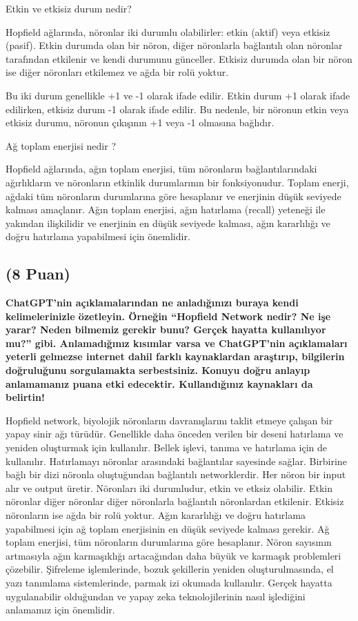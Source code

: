 \documentclass[11pt]{article}
\begin{document}
Etkin ve etkisiz durum nedir?

Hopfield ağlarında, nöronlar iki durumlu olabilirler: etkin (aktif) veya etkisiz (pasif). Etkin durumda olan bir nöron, diğer nöronlarla bağlantılı olan nöronlar tarafından etkilenir ve kendi durumunu günceller. Etkisiz durumda olan bir nöron ise diğer nöronları etkilemez ve ağda bir rolü yoktur.

Bu iki durum genellikle +1 ve -1 olarak ifade edilir. Etkin durum +1 olarak ifade edilirken, etkisiz durum -1 olarak ifade edilir. Bu nedenle, bir nöronun etkin veya etkisiz durumu, nöronun çıkışının +1 veya -1 olmasına bağlıdır.

Ağ toplam enerjisi nedir ?

Hopfield ağlarında, ağın toplam enerjisi, tüm nöronların bağlantılarındaki ağırlıkların ve nöronların etkinlik durumlarının bir fonksiyonudur. Toplam enerji, ağdaki tüm nöronların durumlarına göre hesaplanır ve enerjinin düşük seviyede kalması amaçlanır. Ağın toplam enerjisi, ağın hatırlama (recall) yeteneği ile yakından ilişkilidir ve enerjinin en düşük seviyede kalması, ağın kararlılığı ve doğru hatırlama yapabilmesi için önemlidir.


\subsection{(8 Puan)} \textbf{ChatGPT’nin açıklamalarından ne anladığınızı buraya kendi kelimelerinizle özetleyin. Örneğin ``Hopfield Network nedir? Ne işe yarar? Neden bilmemiz gerekir bunu? Gerçek hayatta kullanılıyor mu?'' gibi. Anlamadığınız kısımlar varsa ve ChatGPT’nin açıklamaları yeterli gelmezse internet dahil farklı kaynaklardan araştırıp, bilgilerin doğruluğunu sorgulamakta serbestsiniz. Konuyu doğru anlayıp anlamamanız puana etki edecektir. Kullandığınız kaynakları da belirtin!}

Hopfield network, biyolojik nöronların davranışlarını taklit etmeye çalışan bir yapay sinir ağı türüdür. Genellikle daha önceden verilen bir deseni hatırlama ve yeniden oluşturmak için kullanılır. Bellek işlevi, tanıma ve hatırlama için de kullanılır. 
Hatırlamayı nöronlar arasındaki bağlantılar sayesinde sağlar. Birbirine bağlı bir dizi nöronla oluştuğundan bağlantılı networklerdir. Her nöron bir input alır ve output üretir. Nöronları iki durumludur, etkin ve etksiz olabilir. Etkin nöronlar diğer nöronlar diğer nöronlarla bağlantılı nöronlardan etkilenir. Etkisiz nöronların ise ağda bir rolü yoktur.
Ağın kararlılığı ve doğru hatırlama yapabilmesi için ağ toplam enerjisinin en düşük seviyede kalması gerekir. Ağ toplam enerjisi, tüm nöronların durumlarına göre hesaplanır.
Nöron sayısının artmasıyla ağın karmaşıklığı artacağından daha büyük ve karmaşık problemleri çözebilir. 
Şifreleme işlemlerinde, bozuk şekillerin yeniden oluşturulmasında, el yazı tanımlama sistemlerinde, parmak izi okumada kullanılır.
Gerçek hayatta uygulanabilir olduğundan ve yapay zeka teknolojilerinin nasıl işlediğini anlamamız için önemlidir.
\end{document}
